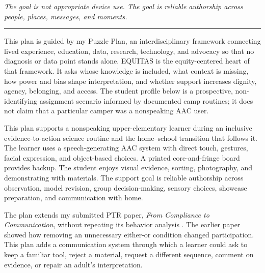 \documentclass[11pt]{article}
\newcommand{\reviewsection}[1]{%
  \Needspace{4\baselineskip}
  \vspace{0.08in}\noindent{\normalsize\bfseries\color{PrimaryRed}#1}
  \par\vspace{0.025in}
}
\begin{document}
\begin{titlepage}
\vfill

\begin{center}
\begin{minipage}{0.92\textwidth}
\centering\itshape
The goal is not appropriate device use. The goal is reliable authorship across people, places, messages, and moments.\\
{\color{PrimaryRed}\rule{4.4in}{0.8pt}}
\end{minipage}
\end{center}

\vfill

\begin{center}
\begin{minipage}{0.95\textwidth}
\small
This plan is guided by my Puzzle Plan, an interdisciplinary framework connecting lived experience, education, data, research, technology, and advocacy so that no diagnosis or data point stands alone. EQUITAS is the equity-centered heart of that framework. It asks whose knowledge is included, what context is missing, how power and bias shape interpretation, and whether support increases dignity, agency, belonging, and access. The student profile below is a prospective, non-identifying assignment scenario informed by documented camp routines; it does not claim that a particular camper was a nonspeaking AAC user.
\end{minipage}
\end{center}

\restoregeometry
\end{titlepage}
\hypersetup{pageanchor=true}

\reviewsection{Purpose and Student Profile}

This plan supports a nonspeaking upper-elementary learner during an inclusive evidence-to-action science routine and the home--school transition that follows it. The learner uses a speech-generating AAC system with direct touch, gestures, facial expression, and object-based choices. A printed core-and-fringe board provides backup. The student enjoys visual evidence, sorting, photography, and demonstrating with materials. The support goal is reliable authorship across observation, model revision, group decision-making, sensory choices, showcase preparation, and communication with home.

The plan extends my submitted PTR paper, \textit{From Compliance to Communication}, without repeating its behavior analysis \citep{garciabautista2026ptr}. The earlier paper showed how removing an unnecessary either-or condition changed participation. This plan adds a communication system through which a learner could ask to keep a familiar tool, reject a material, request a different sequence, comment on evidence, or repair an adult's interpretation.
\end{document}
